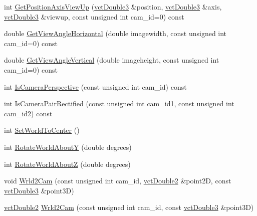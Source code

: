 \begin{DoxyCompactItemize}
\item 
int \hyperlink{classsvl_camera_geometry_a5f293aec0d4e9d41a4c8d30dfc77dee1}{Get\-Position\-Axis\-View\-Up} (\hyperlink{vct_fixed_size_vector_types_8h_a4a89122c9d7f72c3f31fe8126e17c3af}{vct\-Double3} \&position, \hyperlink{vct_fixed_size_vector_types_8h_a4a89122c9d7f72c3f31fe8126e17c3af}{vct\-Double3} \&axis, \hyperlink{vct_fixed_size_vector_types_8h_a4a89122c9d7f72c3f31fe8126e17c3af}{vct\-Double3} \&viewup, const unsigned int cam\-\_\-id=0) const 
\item 
double \hyperlink{classsvl_camera_geometry_a8adb85f453b87c6d2ba7fe40262e3680}{Get\-View\-Angle\-Horizontal} (double imagewidth, const unsigned int cam\-\_\-id=0) const 
\item 
double \hyperlink{classsvl_camera_geometry_a8117e2bb1739baadf3061bace9341a4b}{Get\-View\-Angle\-Vertical} (double imageheight, const unsigned int cam\-\_\-id=0) const 
\item 
int \hyperlink{classsvl_camera_geometry_a0db228770638c03964201ace4b75d34a}{Is\-Camera\-Perspective} (const unsigned int cam\-\_\-id) const 
\item 
int \hyperlink{classsvl_camera_geometry_a6563c6a2d6091bb39bdbea97f653b578}{Is\-Camera\-Pair\-Rectified} (const unsigned int cam\-\_\-id1, const unsigned int cam\-\_\-id2) const 
\item 
int \hyperlink{classsvl_camera_geometry_a14dfa42e2f573c50c82d7ba1d45542c7}{Set\-World\-To\-Center} ()
\item 
int \hyperlink{classsvl_camera_geometry_ae413342f4dc14a6e728b408c6b31bf04}{Rotate\-World\-About\-Y} (double degrees)
\item 
int \hyperlink{classsvl_camera_geometry_ac9cbf80ca8a2f17a6297e458710bab16}{Rotate\-World\-About\-Z} (double degrees)
\item 
void \hyperlink{classsvl_camera_geometry_acb82582bb903c09ebb98cd4c24c8d2e5}{Wrld2\-Cam} (const unsigned int cam\-\_\-id, \hyperlink{vct_fixed_size_vector_types_8h_afc0fdcc41cbe8b043747612501610812}{vct\-Double2} \&point2\-D, const \hyperlink{vct_fixed_size_vector_types_8h_a4a89122c9d7f72c3f31fe8126e17c3af}{vct\-Double3} \&point3\-D)
\item 
\hyperlink{vct_fixed_size_vector_types_8h_afc0fdcc41cbe8b043747612501610812}{vct\-Double2} \hyperlink{classsvl_camera_geometry_a0d644b2fcc4c6220c5da4af6aa9ccc43}{Wrld2\-Cam} (const unsigned int cam\-\_\-id, const \hyperlink{vct_fixed_size_vector_types_8h_a4a89122c9d7f72c3f31fe8126e17c3af}{vct\-Double3} \&point3\-D)
\item 

\end{DoxyCompactItemize}
